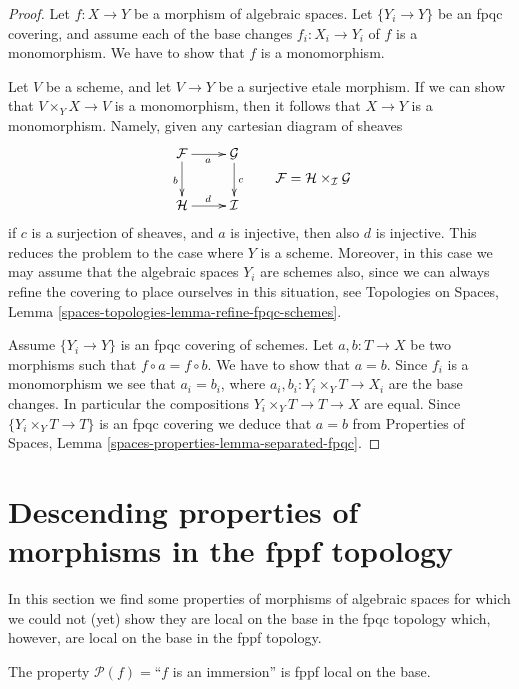 \begin{proof}
Let $f : X \to Y$ be a morphism of algebraic spaces.
Let $\{Y_i \to Y\}$ be an fpqc covering, and assume
each of the base changes $f_i : X_i \to Y_i$ of $f$ is
a monomorphism. We have to show that $f$ is a monomorphism.

\medskip\noindent
Let $V$ be a scheme, and let $V \to Y$ be a surjective etale morphism.
If we can show that $V \times_Y X \to V$ is a monomorphism, then it
follows that $X \to Y$ is a monomorphism. Namely, given any
cartesian diagram of sheaves
$$
\vcenter{
\xymatrix{
\mathcal{F} \ar[r]_a \ar[d]_b & \mathcal{G} \ar[d]^c \\
\mathcal{H} \ar[r]^d & \mathcal{I}
}
}
\quad
\quad
\mathcal{F} = \mathcal{H} \times_\mathcal{I} \mathcal{G}
$$
if $c$ is a surjection of sheaves, and $a$ is injective, then also
$d$ is injective. This reduces the problem to the case where $Y$ is
a scheme. Moreover, in this case we may assume that the algebraic spaces
$Y_i$ are schemes also, since we can always refine the covering to place
ourselves in this situation, see
Topologies on Spaces, Lemma \ref{spaces-topologies-lemma-refine-fpqc-schemes}.

\medskip\noindent
Assume $\{Y_i \to Y\}$ is an fpqc covering of schemes.
Let $a, b : T \to X$ be two morphisms
such that $f \circ a = f \circ b$. We have to show that $a = b$.
Since $f_i$ is a monomorphism we see that $a_i = b_i$, where
$a_i, b_i : Y_i \times_Y T \to X_i$ are
the base changes. In particular the compositions
$Y_i \times_Y T \to T \to X$ are equal.
Since $\{Y_i \times_Y T \to T\}$ is an fpqc covering we
deduce that $a = b$ from
Properties of Spaces, Lemma \ref{spaces-properties-lemma-separated-fpqc}.
\end{proof}




\section{Descending properties of morphisms in the fppf topology}
\label{section-descending-properties-morphisms-fppf}

\noindent
In this section we find some properties of morphisms of algebraic spaces
for which we could not (yet) show they are local on the base in
the fpqc topology which, however, are local on the base
in the fppf topology.

\begin{lemma}
\label{lemma-descending-fppf-property-immersion}
The property $\mathcal{P}(f) =$``$f$ is an immersion''
is fppf local on the base.
\end{lemma}

